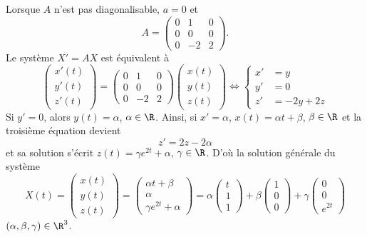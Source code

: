 {\begin{enumerate}
{Lorsque $A$ n'est pas diagonalisable, $a=0$ et 
$$A=\begin{pmatrix}0&1&0 \\  0&0&0 \\  0&-2&2\end{pmatrix}.$$
Le système $X'=AX$ est équivalent à
$$\begin{pmatrix}x'(t) \\  y'(t) \\  z'(t)\end{pmatrix}=\begin{pmatrix}0&1&0 \\  0&0&0 \\  0&-2&2\end{pmatrix}
\begin{pmatrix}x(t) \\  y(t) \\  z(t)\end{pmatrix}\iff
\left\{\begin{align*}x'&=y \\  y'&=0 \\  z'&=-2y+2z\end{align*}\right.$$
Si $y'=0$, alors $y(t)=\alpha$, $\alpha\in\R$. Ainsi, si $x'=\alpha$, $x(t)=\alpha t+\beta$, $\beta\in\R$ et la troisième équation devient
$$z'=2z-2\alpha$$
et sa solution s'écrit $z(t)=\gamma e^{2t}+\alpha$, $\gamma\in\R$. D'où la solution générale du système
$$X(t)=\begin{pmatrix}x(t) \\  y(t) \\  z(t)\end{pmatrix}=\begin{pmatrix}\alpha t+\beta \\  \alpha \\  \gamma e^{2t}+\alpha\end{pmatrix}=\alpha\begin{pmatrix}t \\ 1 \\ 1\end{pmatrix}+\beta\begin{pmatrix}1 \\ 0 \\ 0\end{pmatrix}+\gamma\begin{pmatrix}0 \\ 0 \\  e^{2t}\end{pmatrix}$$
$(\alpha,\beta,\gamma)\in\R^3$.}
\end{enumerate}
}
